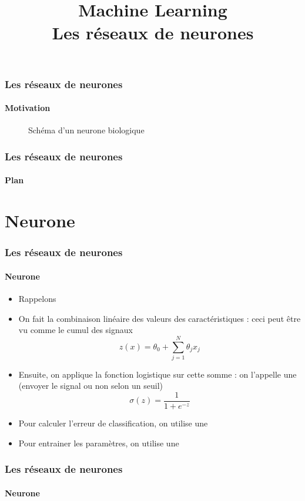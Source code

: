 \documentclass[xcolor=table]{beamer}
\title[ML: Réseaux de neurones] %
{Machine Learning \\Les réseaux de neurones}
\begin{document}
\begin{frame}
\frametitle{Les réseaux de neurones}
\framesubtitle{Motivation}

\begin{figure}
	\centering
	\caption{Schéma d'un neurone biologique \cite{2017-cain}}
\end{figure}

\end{frame}

\begin{frame}
\frametitle{Les réseaux de neurones}
\framesubtitle{Plan}

\begin{multicols}{2}
	\tableofcontents
\end{multicols}
\end{frame}

\section{Neurone}

\begin{frame}
\frametitle{Les réseaux de neurones}
\framesubtitle{Neurone}

\begin{itemize}
	\item Rappelons 
	\item On fait la combinaison linéaire des valeurs des caractéristiques : ceci peut être vu comme le cumul des signaux
	\[z(x) = \theta_0 + \sum\limits_{j=1}^{N} \theta_j x_j\]
	\item Ensuite, on applique la fonction logistique sur cette somme : on l'appelle une  (envoyer le signal ou non selon un seuil) 
	\[\sigma(z) = \frac{1}{1 + e^{-z}}\] 
	\item Pour calculer l'erreur de classification, on utilise une 
	\item Pour entrainer les paramètres, on utilise une 
\end{itemize}

\end{frame}

\begin{frame}
\frametitle{Les réseaux de neurones}
\framesubtitle{Neurone}


\end{frame}
\end{document}
